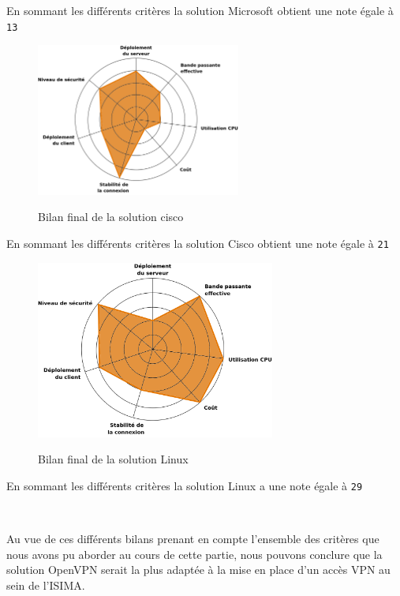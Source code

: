 En sommant les différents critères la solution Microsoft obtient une note égale à \verb|13|

\begin{figure}[H]
	\begin{center}
		\includegraphics[width=0.6\textwidth]{partie_3/images/cisco.png}\\
	\end{center}
	\caption{Bilan final de la solution cisco}
	\label{Graphe cisco}
\end{figure}

En sommant les différents critères la solution Cisco obtient une note égale à \verb|21|

\begin{figure}[H]
	\begin{center}
		\includegraphics[width=0.7\textwidth]{partie_3/images/linux.png}\\
	\end{center}
	\caption{Bilan final de la solution Linux}
	\label{Graphe linux}
\end{figure}

En sommant les différents critères la solution Linux a une note égale à \verb|29|

~

Au vue de ces différents bilans prenant en compte l'ensemble des critères que nous avons pu aborder au cours de cette partie, nous pouvons conclure que la solution OpenVPN serait la plus adaptée à la mise en place d'un accès VPN au sein de l'ISIMA.
